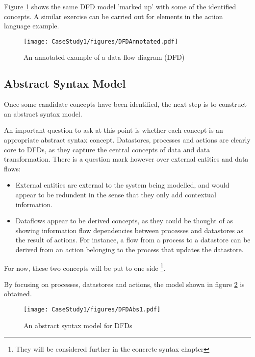 Figure \ref{dfdannotated} shows the same DFD model 'marked up' with
some of the identified concepts. A similar exercise can be carried
out for elements in the action language example.

\begin{figure}[htb]
\begin{center}
\texttt{[image: CaseStudy1/figures/DFDAnnotated.pdf]}
\caption{An annotated example of a data flow diagram (DFD)}
\label{dfdannotated}
\end{center}
\end{figure}

\subsection{Abstract Syntax Model}

Once some candidate concepts have been identified, the next step is
to construct an abstract syntax model.

An important question to ask at this point is whether each concept
is an appropriate abstract syntax concept. Datastores, processes
and actions are clearly core to DFDs, as they capture the central
concepts of data and data transformation. There is a question mark
however over external entities and data flows:

\begin{itemize}
\item External entities are external to the system being modelled,
and would appear to be redundent in the sense that they only add
contextual information.
\item Dataflows appear to be derived concepts, as they could be thought
of as showing information flow dependencies between processes and
datastores as the result of actions. For instance, a flow from a
process to a datastore can be derived from an action belonging to
the process that updates the datastore.
\end{itemize}

\noindent For now, these two concepts will be put to one side
\footnote{They will be considered further in the concrete syntax
chapter}.

By focusing on processes, datastores and actions, the model shown
in figure \ref{dfdabs1} is obtained.

\begin{figure}[htb]
\begin{center}
\texttt{[image: CaseStudy1/figures/DFDAbs1.pdf]}
\caption{An abstract syntax model for DFDs} \label{dfdabs1}
\end{center}
\end{figure}

